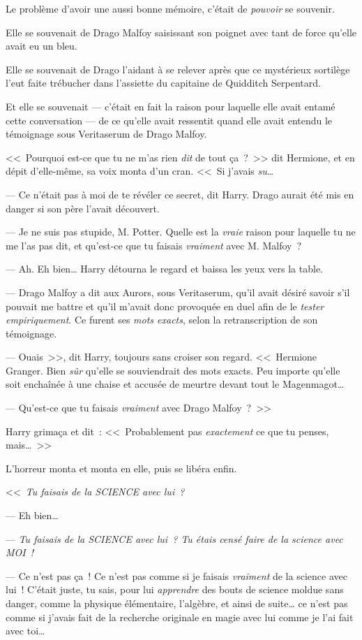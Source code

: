 Le problème d'avoir une aussi bonne mémoire, c'était de \emph{pouvoir} se souvenir.

Elle se souvenait de Drago Malfoy saisissant son poignet avec tant de force qu'elle avait eu un bleu.

Elle se souvenait de Drago l'aidant à se relever après que ce mystérieux sortilège l'eut faite trébucher dans l'assiette du capitaine de Quidditch Serpentard.

Et elle se souvenait — c'était en fait la raison pour laquelle elle avait entamé cette conversation — de ce qu'elle avait ressentit quand elle avait entendu le témoignage sous Veritaserum de Drago Malfoy.

<<~Pourquoi est-ce que tu ne m'as rien \emph{dit} de tout ça~?~>> dit Hermione, et en dépit d'elle-même, sa voix monta d'un cran. <<~Si j'avais \emph{su}…

--- Ce n'était pas à moi de te révéler ce secret, dit Harry. Drago aurait été mis en danger si son père l'avait découvert.

--- Je ne suis pas stupide, M. Potter. Quelle est la \emph{vraie} raison pour laquelle tu ne me l'as pas dit, et qu'est-ce que tu faisais \emph{vraiment} avec M. Malfoy~?

--- Ah. Eh bien… Harry détourna le regard et baissa les yeux vers la table.

--- Drago Malfoy a dit aux Aurors, sous Veritaserum, qu'il avait désiré savoir s'il pouvait me battre et qu'il m'avait donc provoquée en duel afin de le \emph{tester empiriquement}. Ce furent ses \emph{mots exacts}, selon la retranscription de son témoignage.

--- Ouais~>>, dit Harry, toujours sans croiser son regard. <<~Hermione Granger. Bien \emph{sûr} qu'elle se souviendrait des mots exacts. Peu importe qu'elle soit enchaînée à une chaise et accusée de meurtre devant tout le Magenmagot…

--- Qu'est-ce que tu faisais \emph{vraiment} avec Drago Malfoy~?~>>

Harry grimaça et dit~: <<~Probablement pas \emph{exactement} ce que tu penses, mais…~>>

L'horreur monta et monta en elle, puis se libéra enfin.

<<~\emph{Tu faisais de la SCIENCE avec lui~?}

--- Eh bien…

--- \emph{Tu faisais de la SCIENCE avec lui~? Tu étais censé faire de la science avec MOI~!}

--- Ce n'est pas ça~! Ce n'est pas comme si je faisais \emph{vraiment} de la science avec lui~! C'était juste, tu sais, pour lui \emph{apprendre} des bouts de science moldue sans danger, comme la physique élémentaire, l'algèbre, et ainsi de suite… ce n'est pas comme si j'avais fait de la recherche originale en magie avec lui comme je l'ai fait avec toi…

